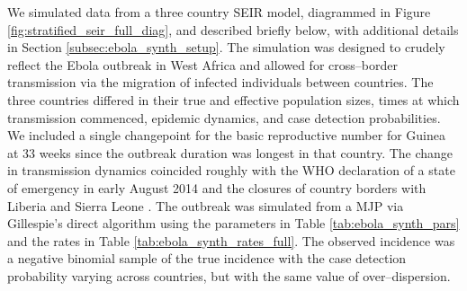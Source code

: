 We simulated data from a three country SEIR model, diagrammed in Figure \ref{fig:stratified_seir_full_diag}, and described briefly below, with additional details in Section \ref{subsec:ebola_synth_setup}. The simulation was designed to crudely reflect the Ebola outbreak in West Africa and allowed for cross--border transmission via the migration of infected individuals between countries. The three countries differed in their true and effective population sizes, times at which transmission commenced, epidemic dynamics, and case detection probabilities. We included a single changepoint for the basic reproductive number for Guinea at 33 weeks since the outbreak duration was longest in that country. The change in transmission dynamics coincided roughly with the WHO declaration of a state of emergency in early August 2014 and the closures of country borders with Liberia and Sierra Leone \cite{coltart2017ebola}. The outbreak was simulated from a MJP via Gillespie's direct algorithm \cite{gillespie1976general} using the parameters in Table \ref{tab:ebola_synth_pars} and the rates in Table \ref{tab:ebola_synth_rates_full}. The observed incidence was a negative binomial sample of the true incidence with the case detection probability varying across countries, but with the same value of over--dispersion.

